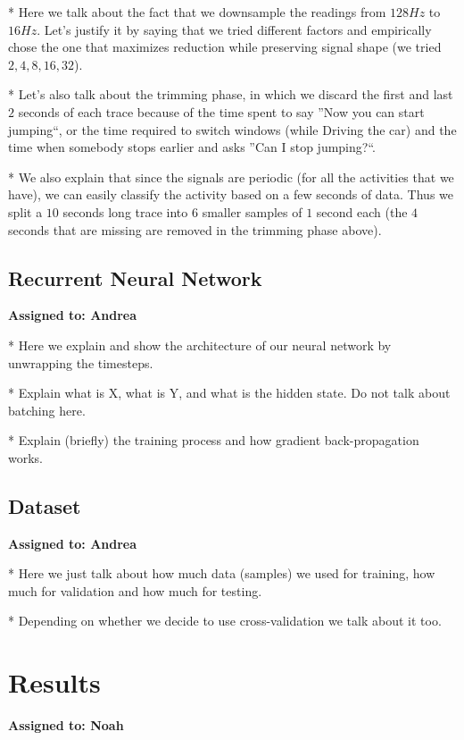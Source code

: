 \documentclass{article}
\begin{document}
* Here we talk about the fact that we downsample the readings from $128Hz$ to $16Hz$. Let's
justify it by saying that we tried different factors and empirically chose the one that maximizes
reduction while preserving signal shape (we tried $2, 4, 8, 16, 32$).

* Let's also talk about the trimming phase, in which we discard the first and last $2$ seconds
of each trace because of the time spent to say ''Now you can start jumping``, or the time
required to switch windows (while Driving the car) and the time when somebody stops earlier and
asks ''Can I stop jumping?``.

* We also explain that since the signals are periodic (for all the activities that we have), we can 
easily classify the activity based on a few seconds of data. Thus we split a $10$ seconds long
trace into $6$ smaller samples of $1$ second each (the $4$ seconds that are missing are removed
in the trimming phase above).


\subsection{Recurrent Neural Network}
\vspace{-.3cm}
\textbf{Assigned to: Andrea}

* Here we explain and show the architecture of our neural network by unwrapping the timesteps.

* Explain what is X, what is Y, and what is the hidden state. Do not talk about batching here.

* Explain (briefly) the training process and how gradient back-propagation works.


\subsection{Dataset}
\vspace{-.3cm} 
\textbf{Assigned to: Andrea}

* Here we just talk about how much data (samples) we used for training, how much for validation
and how much for testing.

* Depending on whether we decide to use cross-validation we talk about it too.


\section{Results}
\vspace{-.3cm}
\textbf{Assigned to: Noah}
\end{document}
